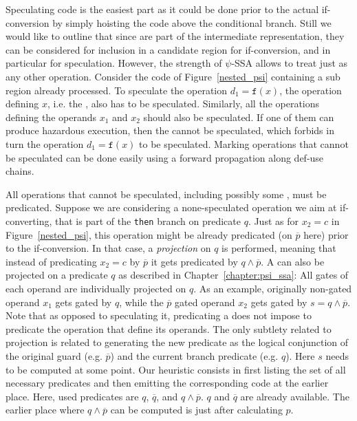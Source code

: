 Speculating code is the easiest part as it could be done prior to the actual if-conversion by simply hoisting the code above the conditional branch. Still we would like to outline that since \psifuns are part of the intermediate representation, they can be considered for inclusion in a candidate region for if-conversion, and in particular for speculation. However, the strength of $\psi$-SSA allows to treat \psifuns just as any other operation. Consider the code of Figure~\ref{nested_psi} containing a sub region already processed. To speculate the operation $d_1=\texttt{f}(x)$, the operation defining $x$, i.e. the \psifun, also has to be speculated. Similarly, all the operations defining the operands $x_1$ and $x_2$ should also be speculated. If one of them can produce hazardous execution, then the \psifun cannot be speculated, which forbids in turn the operation $d_1=\texttt{f}(x)$ to be speculated. Marking operations that cannot be speculated can be done easily using a forward propagation along def-use chains.

All operations that cannot be speculated, including possibly some \psifuns, must be predicated. Suppose we are considering a none-speculated operation we aim at if-converting, that is part of the \texttt{then} branch on predicate $q$. Just as for $x_2=c$ in Figure~\ref{nested_psi}, this operation might be already predicated (on $\overline{p}$ here) prior to the if-conversion. In that case, a \textit{projection} on $q$ is performed, meaning that instead of predicating $x_2=c$ by $\overline{p}$ it gets predicated by $q\wedge \overline{p}$. A \psifun can also be projected on a predicate $q$ as described in Chapter~\ref{chapter:psi_ssa}: All gates of each operand are individually projected on $q$. As an example, originally non-gated operand $x_1$ gets gated by $q$, while the $\overline{p}$ gated operand $x_2$ gets gated by $s=q\wedge\overline{p}$. Note that as opposed to speculating it, predicating a \psifun does not impose to predicate the operation that define its operands. The only subtlety related to projection is related to generating the new predicate as the logical conjunction of the original guard (e.g. $\overline{p}$) and the current branch predicate (e.g. $q$). Here $s$ needs to be computed at some point. Our heuristic consists in first listing the set of all necessary predicates and then emitting the corresponding code at the earlier place. Here, used predicates are $q$, $\overline{q}$, and $q\wedge\overline{p}$. $q$ and $\overline{q}$ are already available. The earlier place where $q\wedge\overline{p}$ can be computed is just after calculating $p$.

